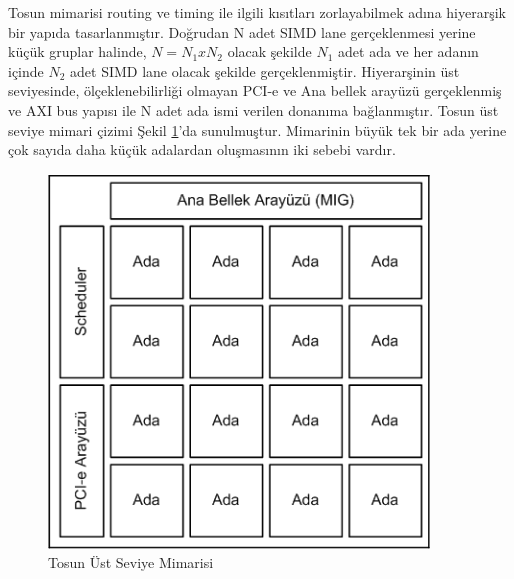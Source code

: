 Tosun mimarisi routing ve timing ile ilgili kısıtları zorlayabilmek adına hiyerarşik bir yapıda tasarlanmıştır. Doğrudan N adet SIMD lane gerçeklenmesi yerine küçük gruplar halinde, $N=N_{1}xN_{2}$ olacak şekilde $N_{1}$ adet ada ve her adanın içinde $N_{2}$ adet SIMD lane olacak şekilde gerçeklenmiştir. Hiyerarşinin üst seviyesinde, ölçeklenebilirliği olmayan PCI-e ve Ana bellek arayüzü gerçeklenmiş ve AXI bus yapısı ile N adet ada ismi verilen donanıma bağlanmıştır. Tosun üst seviye mimari çizimi Şekil \ref{image:genelMimari}’da sunulmuştur. Mimarinin büyük tek bir ada yerine çok sayıda daha küçük adalardan oluşmasının iki sebebi  vardır. \par
\begin{figure}[h]
\centering
\shorthandoff{=}
\includegraphics[width=0.9\textwidth]{gorsel/genelMimari.png}
\shorthandoff{=}
\caption{Tosun Üst Seviye Mimarisi}
\label{image:genelMimari}
\end{figure}
